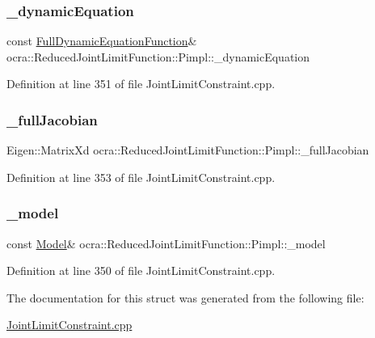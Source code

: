\subsubsection{\texorpdfstring{\+\_\+dynamic\+Equation}{\_dynamicEquation}}
{\footnotesize\ttfamily const \hyperlink{classocra_1_1FullDynamicEquationFunction}{Full\+Dynamic\+Equation\+Function}\& ocra\+::\+Reduced\+Joint\+Limit\+Function\+::\+Pimpl\+::\+\_\+dynamic\+Equation}



Definition at line 351 of file Joint\+Limit\+Constraint.\+cpp.

\hypertarget{structReducedJointLimitFunction_1_1Pimpl_ae45e80b72fb13b54452c6ce9fe9e3798}{}\label{structReducedJointLimitFunction_1_1Pimpl_ae45e80b72fb13b54452c6ce9fe9e3798} 
\subsubsection{\texorpdfstring{\+\_\+full\+Jacobian}{\_fullJacobian}}
{\footnotesize\ttfamily Eigen\+::\+Matrix\+Xd ocra\+::\+Reduced\+Joint\+Limit\+Function\+::\+Pimpl\+::\+\_\+full\+Jacobian}



Definition at line 353 of file Joint\+Limit\+Constraint.\+cpp.

\hypertarget{structReducedJointLimitFunction_1_1Pimpl_abe6f625fec9bf8cff9f847bde9eb9ee2}{}\label{structReducedJointLimitFunction_1_1Pimpl_abe6f625fec9bf8cff9f847bde9eb9ee2} 
\subsubsection{\texorpdfstring{\+\_\+model}{\_model}}
{\footnotesize\ttfamily const \hyperlink{classocra_1_1Model}{Model}\& ocra\+::\+Reduced\+Joint\+Limit\+Function\+::\+Pimpl\+::\+\_\+model}



Definition at line 350 of file Joint\+Limit\+Constraint.\+cpp.



The documentation for this struct was generated from the following file\+:\begin{DoxyCompactItemize}
\item 
\hyperlink{JointLimitConstraint_8cpp}{Joint\+Limit\+Constraint.\+cpp}\end{DoxyCompactItemize}
